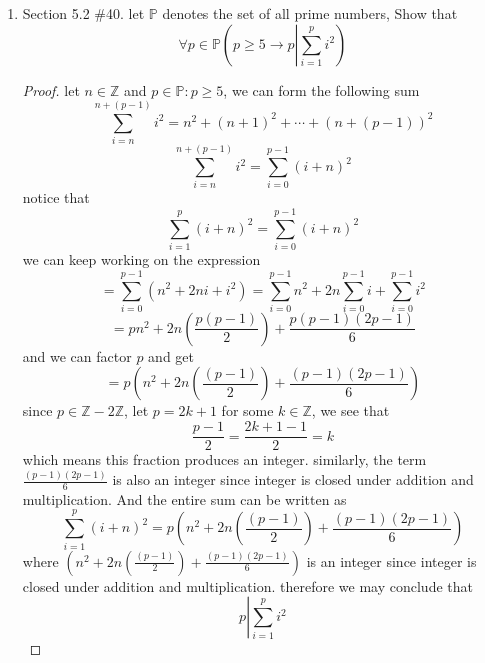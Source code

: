 \documentclass[12pt]{article}
\newcommand{\Z}{\mathbb{Z}}
\newcommand{\odd}[0]{\mathbb{Z} - 2\mathbb{Z}}
\newcommand{\paren}[1]{\left( #1 \right)}
\newcommand{\then}{\rightarrow}
\begin{document}
\begin{enumerate}
\begin{enumerate}
\begin{proof}
            \end{proof}
            

            
        \end{enumerate}

    \item Section 5.2 \#40. let $\mathbb{P}$ denotes the set of all prime numbers, Show that
        \[
        \forall p \in \mathbb{P} \paren{p \geq 5 \then p \left| \sum_{i=1}^{p}i^2\right.}
        \]
        \begin{proof}
            let $n \in \Z$ and $p \in \mathbb{P}: p \geq 5$, we can form the following sum
            \[
            \sum_{i=n}^{n+(p-1)}i^2 = n^2 + (n+1)^2 +\cdots +\paren{n+\paren{p-1}}^2
            \]
            \[
             \sum_{i=n}^{n+(p-1)}i^2 = \sum_{i=0}^{p-1} \paren{i+n}^2
            \]
            notice that
            \[
            \sum_{i=1}^{p} \paren{i+n}^2 = \sum_{i=0}^{p-1} \paren{i+n}^2 
            \]
            we can keep working on the expression
            \[
            =\sum_{i=0}^{p-1} \paren{n^2 + 2ni+i^2} = \sum_{i=0}^{p-1} n^2 + 2n\sum_{i=0}^{p-1} i + \sum_{i=0}^{p-1}i^2
            \]
            \[
            = pn^2 + 2n\paren{\frac{p(p-1)}{2}} + \frac{p(p-1)(2p-1)}{6}
            \]
            and we can factor $p$ and get
            \[
            =p\paren{n^2 + 2n\paren{\frac{(p-1)}{2}} + \frac{(p-1)(2p-1)}{6}}
            \]
            since $p \in \odd$, let $p = 2k+1$ for some $k \in \Z$, we see that
            \[
            \frac{p-1}{2} = \frac{2k+1-1}{2} = k
            \]
            which means this fraction produces an integer. similarly, the term $\frac{(p-1)(2p-1)}{6}$ is also an integer since integer is closed under addition and multiplication. And the entire sum can be written as
            \[
            \sum_{i=1}^{p} \paren{i+n}^2 = p\paren{n^2 + 2n\paren{\frac{(p-1)}{2}} + \frac{(p-1)(2p-1)}{6}}
            \]
            where $\paren{n^2 + 2n\paren{\frac{(p-1)}{2}} + \frac{(p-1)(2p-1)}{6}}$ is an integer since integer is closed under addition and multiplication. therefore we may conclude that
            \[
            p \left| \sum_{i=1}^{p}i^2\right.
            \]
        \end{proof}
    

\end{enumerate}
\end{document}
